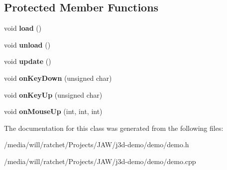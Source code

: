 \subsection*{Protected Member Functions}
\begin{DoxyCompactItemize}
\item 
\hypertarget{classDemo_acc38841a2fbde4d25340a3e6eb32e25d}{}void {\bfseries load} ()\label{classDemo_acc38841a2fbde4d25340a3e6eb32e25d}

\item 
\hypertarget{classDemo_ae09fe28d4f7a2db64da1850b3c9a05a0}{}void {\bfseries unload} ()\label{classDemo_ae09fe28d4f7a2db64da1850b3c9a05a0}

\item 
\hypertarget{classDemo_a88a7ddbf3a2abcb93ace999b607fae61}{}void {\bfseries update} ()\label{classDemo_a88a7ddbf3a2abcb93ace999b607fae61}

\item 
\hypertarget{classDemo_aeab99b8d2963cf21020d41fd99db023e}{}void {\bfseries on\+Key\+Down} (unsigned char)\label{classDemo_aeab99b8d2963cf21020d41fd99db023e}

\item 
\hypertarget{classDemo_aea65cbc08318f2a3e59c72f35fa9917b}{}void {\bfseries on\+Key\+Up} (unsigned char)\label{classDemo_aea65cbc08318f2a3e59c72f35fa9917b}

\item 
\hypertarget{classDemo_af452710deabb9393252eb9924eddd354}{}void {\bfseries on\+Mouse\+Up} (int, int, int)\label{classDemo_af452710deabb9393252eb9924eddd354}

\end{DoxyCompactItemize}


The documentation for this class was generated from the following files\+:\begin{DoxyCompactItemize}
\item 
/media/will/ratchet/\+Projects/\+J\+A\+W/j3d-\/demo/demo/demo.\+h\item 
/media/will/ratchet/\+Projects/\+J\+A\+W/j3d-\/demo/demo/demo.\+cpp\end{DoxyCompactItemize}
